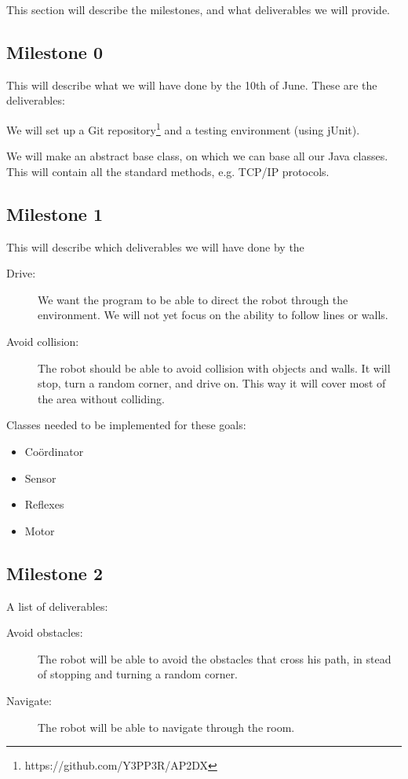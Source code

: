 This section will describe the milestones, and what deliverables we will provide. 

\subsection*{Milestone 0}
This will describe what we will have done by the 10th of June. These are the
deliverables:
\begin{description}
\vspace{0cm}
\item[Working environment:] We will set up a Git
repository\footnote{https://github.com/Y3PP3R/AP2DX} and a testing environment
(using jUnit).
\item[Base class:] We will make an abstract base class, on which we can base
all our Java classes. This will contain all the standard methods, e.g. TCP/IP
protocols.
\end{description}

\subsection*{Milestone 1}
This will describe which deliverables we will have done by the 
\begin{description}
\item[Drive:] We want the program to be able to direct
the robot through the environment. We will not yet focus on the ability to
follow lines or walls.
\item[Avoid collision:] The robot should be able to avoid collision with objects
and walls. It will stop, turn a random corner, and drive on. This way it will
cover most of the area without colliding.
\end{description}

Classes needed to be implemented for these goals:
\begin{itemize}
\item Co\"ordinator
\item Sensor
\item Reflexes
\item Motor
\end{itemize}

\subsection*{Milestone 2}
A list of deliverables:
\begin{description}
\item[Avoid obstacles:] The robot will be able to avoid the obstacles that
cross his path, in stead of stopping and turning a random corner.
\item[Navigate:] The robot will be able to navigate through the room.
\end{description}

